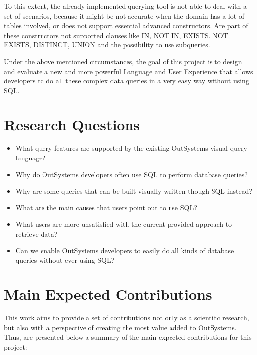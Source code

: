 To this extent, the already implemented querying tool is not able to deal with a set of scenarios, because it might be not accurate when the domain has a lot of tables involved, or does not support essential advanced constructors. Are part of these constructors not supported clauses like IN, NOT IN, EXISTS, NOT EXISTS, DISTINCT, UNION and the possibility to use subqueries.

Under the above mentioned circumstances, the goal of this project is to design and evaluate a new and more powerful Language and User Experience that allows developers to do all these complex data queries in a very easy way without using SQL.

\section{Research Questions}
\label{sec:research_questions}
\begin{itemize}
  \item What query features are supported by the existing OutSystems visual query language?
  \item Why do OutSystems developers often use SQL to perform database queries?
  \item Why are some queries that can be built visually written though SQL instead?
  \item What are the main causes that users point out to use SQL?
  \item What users are more unsatisfied with the current provided approach to retrieve data?
  \item Can we enable OutSystems developers to easily do all kinds of database queries without ever using SQL?
\end{itemize}

\section{Main Expected Contributions}
\label{sec:main_exp_contributions}
This work aims to provide a set of contributions not only as a scientific research, but also with a perspective of creating the most value added to OutSystems. Thus, are presented below a summary of the main expected contributions for this project:


